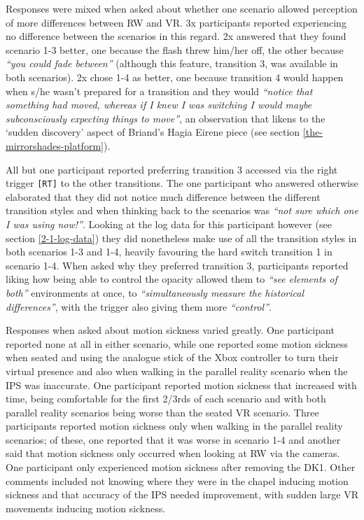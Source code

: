 Responses were mixed when asked about whether one scenario allowed perception of more differences between RW and VR. 3x participants reported experiencing no difference between the scenarios in this regard. 2x answered that they found scenario 1-3 better, one because the flash threw him/her off, the other because \textit{``you could fade between''}  (although this feature, transition 3, was available in both scenarios). 2x chose 1-4 as better, one because transition 4 would happen when s/he wasn't prepared for a transition and they would \textit{``notice that something had moved, whereas if I knew I was switching I would maybe subconsciously expecting things to move''}, an observation that likens to the `sudden discovery' aspect of Briand's Hagia Eirene piece (see section \ref{the-mirrorshades-platform}).

All but one participant reported preferring transition 3 accessed via the right trigger \texttt{[RT]} to the other transitions. The one participant who answered otherwise elaborated that they did not notice much difference between the different transition styles and when thinking back to the scenarios was \textit{``not sure which one I was using now!''}. Looking at the log data for this participant however (see section \ref{2-1-log-data}) they did nonetheless make use of all the transition styles in both scenarios 1-3 and 1-4, heavily favouring the hard switch transition 1 in scenario 1-4. When asked why they preferred transition 3, participants reported liking how being able to control the opacity allowed them to \textit{``see elements of both''} environments at once, to \textit{``simultaneously measure the historical differences''}, with the trigger also giving them more \textit{``control''}.

Responses when asked about motion sickness varied greatly. One participant reported none at all in either scenario, while one reported some motion sickness when seated and using the analogue stick of the Xbox controller to turn their virtual presence and also when walking in the parallel reality scenario when the IPS was inaccurate. One participant reported motion sickness that increased with time, being comfortable for the first 2/3rds of each scenario and with both parallel reality scenarios being worse than the seated VR scenario. Three participants reported motion sickness only when walking in the parallel reality scenarios; of these, one reported that it was worse in scenario 1-4 and another said that motion sickness only occurred when looking at RW via the cameras. One participant only experienced motion sickness after removing the DK1. Other comments included not knowing where they were in the chapel inducing motion sickness and that accuracy of the IPS needed improvement, with sudden large VR movements inducing motion sickness.


